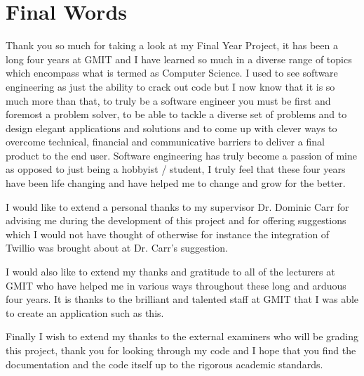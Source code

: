 \section{Final Words}
Thank you so much for taking a look at my Final Year Project, it has been a long four years at GMIT and I have learned so much in a diverse range of topics which encompass what is termed as Computer Science. I used to see software engineering as just the ability to crack out code but I now know that it is so much more than that, to truly be a software engineer you must be first and foremost a problem solver, to be able to tackle a diverse set of problems and to design elegant applications and solutions and to come up with clever ways to overcome technical, financial and communicative barriers to deliver a final product to the end user. Software engineering has truly become a passion of mine as opposed to just being a hobbyist / student, I truly feel that these four years have been life changing and have helped me to change and grow for the better.

I would like to extend a personal thanks to my supervisor Dr. Dominic Carr for advising me during the development of this project and for offering suggestions which I would not have thought of otherwise for instance the integration of Twillio was brought about at Dr. Carr's suggestion.

I would also like to extend my thanks and gratitude to all of the lecturers at GMIT who have helped me in various ways throughout these long and arduous four years. It is thanks to the brilliant and talented staff at GMIT that I was able to create an application such as this.

Finally I wish to extend my thanks to the external examiners who will be grading this project, thank you for looking through my code and I hope that you find the documentation and the code itself up to the rigorous academic standards.

